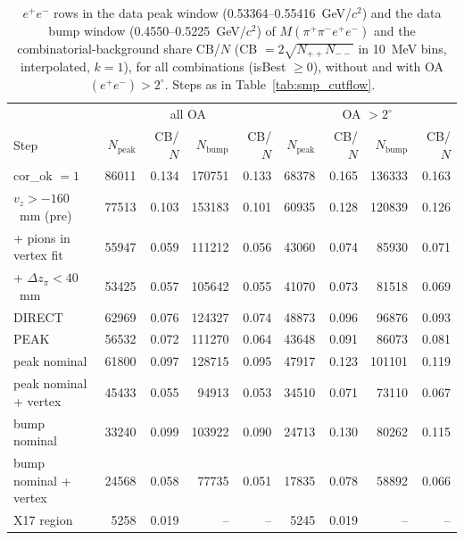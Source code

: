 \begin{table}[H]
\centering\footnotesize
\setlength{\tabcolsep}{3.5pt}
\caption{$e^+e^-$ rows in the data peak window (0.53364--0.55416~GeV/$c^2$) and the data bump window (0.4550--0.5225~GeV/$c^2$) of $M(\pi^+\pi^-e^+e^-)$ and the combinatorial-background share CB/$N$ (CB $=2\sqrt{N_{++}N_{--}}$ in 10~MeV bins, interpolated, $k=1$), for all combinations (isBest $\geq 0$), without and with OA$(e^+e^-)>2^\circ$. Steps as in Table~\ref{tab:smp_cutflow}.}
\label{tab:smp_cutflow_windows}
\begin{tabular}{l rr rr | rr rr}
\toprule
 & \multicolumn{4}{c|}{all OA} & \multicolumn{4}{c}{OA $>2^\circ$} \\
Step & $N_\mathrm{peak}$ & CB/$N$ & $N_\mathrm{bump}$ & CB/$N$ & $N_\mathrm{peak}$ & CB/$N$ & $N_\mathrm{bump}$ & CB/$N$ \\
\midrule
cor\_ok $=1$ & 86011 & 0.134 & 170751 & 0.133 & 68378 & 0.165 & 136333 & 0.163 \\
$v_z>-160$~mm (pre) & 77513 & 0.103 & 153183 & 0.101 & 60935 & 0.128 & 120839 & 0.126 \\
+ pions in vertex fit & 55947 & 0.059 & 111212 & 0.056 & 43060 & 0.074 & 85930 & 0.071 \\
+ $\Delta z_\pi<40$~mm & 53425 & 0.057 & 105642 & 0.055 & 41070 & 0.073 & 81518 & 0.069 \\
\midrule
DIRECT & 62969 & 0.076 & 124327 & 0.074 & 48873 & 0.096 & 96876 & 0.093 \\
PEAK & 56532 & 0.072 & 111270 & 0.064 & 43648 & 0.091 & 86073 & 0.081 \\
peak nominal & 61800 & 0.097 & 128715 & 0.095 & 47917 & 0.123 & 101101 & 0.119 \\
peak nominal + vertex & 45433 & 0.055 & 94913 & 0.053 & 34510 & 0.071 & 73110 & 0.067 \\
bump nominal & 33240 & 0.099 & 103922 & 0.090 & 24713 & 0.130 & 80262 & 0.115 \\
bump nominal + vertex & 24568 & 0.058 & 77735 & 0.051 & 17835 & 0.078 & 58892 & 0.066 \\
X17 region & 5258 & 0.019 & -- & -- & 5245 & 0.019 & -- & -- \\
\bottomrule
\end{tabular}
\end{table}
